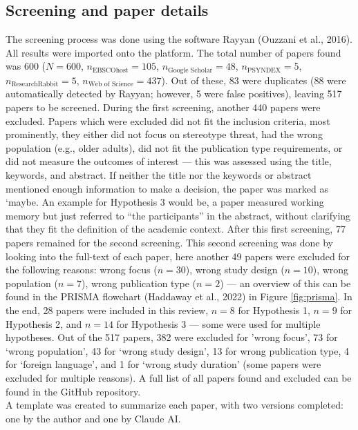 \documentclass[
  stu,floatsintext]{apa7}
\begin{document}
\subsection{Screening and paper details}\label{screening-and-paper-details}

The screening process was done using the software Rayyan (Ouzzani et al., 2016). All results were imported onto the platform.
The total number of papers found was 600 (\(N = 600\), \(n_{\text{EBSCOhost}} = 105\), \(n_{\text{Google Scholar}} = 48\), \(n_{\text{PSYNDEX}} = 5\), \(n_{\text{ResearchRabbit}} = 5\), \(n_{\text{Web of Science}} = 437\)). Out of these, 83 were duplicates (88 were automatically detected by Rayyan; however, 5 were false positives), leaving 517 papers to be screened. During the first screening, another 440 papers were excluded.
Papers which were excluded did not fit the inclusion criteria, most prominently, they either did not focus on stereotype threat, had the wrong population (e.g., older adults), did not fit the publication type requirements, or did not measure the outcomes of interest --- this was assessed using the title, keywords, and abstract. If neither the title nor the keywords or abstract mentioned enough information to make a decision, the paper was marked as `maybe.
An example for Hypothesis 3 would be, a paper measured working memory but just referred to ``the participants'' in the abstract, without clarifying that they fit the definition of the academic context. After this first screening, 77 papers remained for the second screening.
This second screening was done by looking into the full-text of each paper, here another 49 papers were excluded for the following reasons: wrong focus (\(n = 30\)), wrong study design (\(n = 10\)), wrong population (\(n = 7\)), wrong publication type (\(n = 2\)) --- an overview of this can be found in the PRISMA flowchart (Haddaway et al., 2022) in Figure \ref{fig:prisma}.
In the end, 28 papers were included in this review, \(n = 8\) for Hypothesis 1, \(n = 9\) for Hypothesis 2, and \(n = 14\) for Hypothesis 3 --- some were used for multiple hypotheses. Out of the 517 papers, 382 were excluded for 'wrong focus', 73 for `wrong population', 43 for `wrong study design', 13 for wrong publication type, 4 for `foreign language', and 1 for `wrong study duration' (some papers were excluded for multiple reasons). A full list of all papers found and excluded can be found in the GitHub repository.\\
A template was created to summarize each paper, with two versions completed: one by the author and one by Claude AI.
\end{document}

